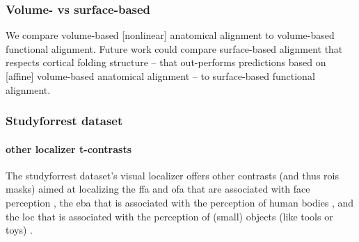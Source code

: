 \subsubsection{Volume- vs surface-based}





We compare volume-based [nonlinear] anatomical alignment to volume-based
functional alignment.
%
Future work could compare surface-based alignment that respects cortical folding
structure -- that out-performs predictions based on [affine] volume-based
anatomical alignment \citep{weiner2018defining} -- to surface-based functional
alignment.


\subsubsection{Studyforrest dataset}

\paragraph{other localizer t-contrasts}



The studyforrest dataset's visual localizer \citep{sengupta2016extension} offers
other contrasts (and thus \acp{roi} masks) aimed at localizing the \ac{ffa} and
\ac{ofa} that are associated with face perception \citep{kanwisher1997ffa,
pitcher2011occipitalfacearea}, the \ac{eba} that is associated with the
perception of human bodies \citep{downing2001bodyarea}, and the \ac{loc} that is
associated with the perception of (small) objects (like tools or toys)
\citep{malach1995loc}.



